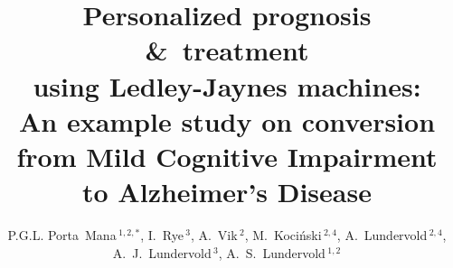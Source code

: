 \documentclass[utf8]{FrontiersinHarvard} %
\newcommand*{\amp}{\&}
\renewcommand*{\|}[1][]{\nonscript\:#1\vert\nonscript\:\mathopen{}}
\newcommand*{\ljm}{Ledley-Jaynes machine}
\def\firstAuthorLast{Porta~Mana {et~al.}} %
\def\Authors{P.G.L. Porta~Mana\,$^{1,2,*}$, I.~Rye\,$^{3}$, A.~Vik\,$^{2}$, M.~Koci\'nski\,$^{2,4}$, A.~Lundervold\,$^{2,4}$, A.~J.~Lundervold\,$^{3}$, A.~S.~Lundervold\,$^{1,2}$}
\begin{document}
\onecolumn
{}

\title[Personalized prognosis \amp\ treatment using a \ljm]{Personalized prognosis \amp\ treatment\\ using Ledley-Jaynes machines:\\ An example study on  conversion from Mild Cognitive Impairment to Alzheimer's Disease} 

\author[\firstAuthorLast ]{\Authors} %
\address{} %
\correspondance{} %

\extraAuth{}%


\maketitle
\end{document}
